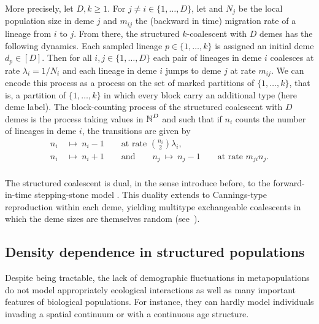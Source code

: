 More precisely, let $D,k\geq 1$. For $j\neq i\in \{1,\ldots,D\}$, let and $N_j$ be the local population size in deme $j$ and $m_{ij}$ the (backward in time) migration rate of a lineage from $i$ to $j$. From there, the structured $k$-coalescent with $D$ demes has the following dynamics.
Each sampled lineage $p\in\{1,\ldots, k\}$ is assigned an initial deme $d_p \in [D]$. 
Then for all $i,j\in\{1,\ldots, D\}$ each pair of lineages in deme $i$ coalesces at rate $\lambda_i=1/N_i$ and each lineage in deme $i$ jumps to deme $j$ at rate $m_{ij}$. We can encode this process as a process on the set of marked partitions of $\{1,\ldots,k\}$, that is, a partition of $\{1,\ldots,k\}$ in which every block carry an additional type (here deme label).
The block-counting process of the structured coalescent with $D$ demes is the process taking values in $\operatorname{\mathbb{N}}^D$ and such that if $n_i$ counts the number of lineages in deme $i$, the transitions are given by
\begin{align*}
n_i\ &\longmapsto\ n_i-1\qquad \text{at rate }\binom{n_i}{2}\lambda_i,\\
n_i\ &\longmapsto\ n_i+1  \qquad\text{and}\qquad n_j\ \longmapsto\ n_j-1 \qquad \text{at rate }m_{ji} n_j.\\
\end{align*}

The structured coalescent is dual, in the sense introduce before, to the
forward-in-time stepping-stone model \cite[Chapter~4]{etheridge_mathematical_2011}.
This duality extends to Cannings-type reproduction within each deme, yielding
multitype exchangeable coalescents in which the deme sizes are themselves random
(see~\citet*{huillet_asymptotic_2021,mohle_multi-type_2024}).


\subsection{Density dependence in structured populations}

Despite being tractable, the lack of demographic fluctuations in metapopulations do not model appropriately ecological interactions as well as many important features of biological populations. For instance,
they can hardly model individuals invading a spatial continuum or
with a continuous age structure.



